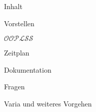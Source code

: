 
\begin{frame}
  \titlepage
\end{frame}

\begin{frame}[t]{Inhalt}
  \begin{bigitemize}[<+->]{3mm}
    \item<1-> Vorstellen

    \item<2-> $\mathcal{OOPLSS}$

    \item<3-> Zeitplan

    \item<3-> Dokumentation

    \item<4-> Fragen

    \item<5-> Varia und weiteres Vorgehen
  \end{bigitemize}
\end{frame}
